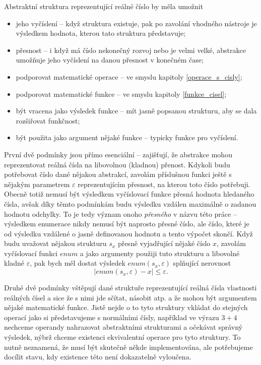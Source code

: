 Abstraktní struktura reprezentující reálné číslo by měla umožnit
\begin{itemize}
\item{jeho vyčíslení -- když struktura existuje, pak po zavolání vhodného nástroje je výsledkem hodnota, kterou tato struktura představuje;}
\item{přesnost -- i když má číslo nekonečný rozvoj nebo je velmi velké, abstrakce umožňuje jeho vyčíslení na danou přesnost v konečném čase;}
\item{podporovat matematické operace -- ve smyslu kapitoly \ref{operace_s_cisly};}
\item{podporovat matematické funkce -- ve smyslu kapitoly \ref{funkce_cisel};}
\item{být vracena jako výsledek funkce -- mít jasně popsanou strukturu, aby se dala rozšiřovat funkčnost;}
\item{být použita jako argument nějaké funkce -- typicky funkce pro vyčíslení.}
\end{itemize}

První dvě podmínky jsou přímo esenciální -- zajišťují, že abstrakce mohou reprezentovat reálná čísla na libovolnou (kladnou) přenost. Kdykoli budu potřebovat číslo dané nějakou abstrakcí, zavolám příslušnou funkci ještě s nějakým parametrem $\varepsilon$ reprezentujícím přesnost, na kterou toto číslo potřebuji. Obecně totiž nemusí být výsledkem vyčíslovací funkce přesná hodnota hledaného čísla, avšak díky těmto podmínkám budu výsledku vzdálen maximálně o zadanou hodnotu odchylky. To je tedy význam onoho \textit{přesného} v názvu této práce -- výsledkem enumerace nikdy nemusí být naprosto přesné číslo, ale číslo, které je od výsledku vzdálené o jasně definovanou hodnotu a tento výpočet skončí. Když budu uvažovat nějakou strukturu $s_x$ přesně vyjadřující nějaké číslo $x$, zavolám vyčíslovací funkci $enum$ a jako argumenty použiji tuto strukturu a libovolné kladné $\varepsilon$, pak bych měl dostat výsledek $enum(s_x, \varepsilon)$ splňující nerovnost
\begin{equation}
|enum(s_x, \varepsilon)-x| \leq \varepsilon.
\end{equation}

Druhé dvě podmínky vštěpují dané struktuře reprezentující reálná čísla vlastnosti reálných čísel a sice že s nimi jde sčítat, násobit atp. a že mohou být argumentem nějaké matematické funkce. Jistě nejde o to tyto struktury vkládat do stejných operací jako si představujeme s normálními čísly, například ve výrazu $3+4$ nechceme operandy nahrazovat abstraktními strukturami a očekávat správný výsledek, nýbrž chceme existenci ekvivalentní operace pro tyto struktury. To nutně neznamená, že musí být skutečně někde implementována, ale potřebujeme docílit stavu, kdy existence této není dokazatelně vyloučena.

